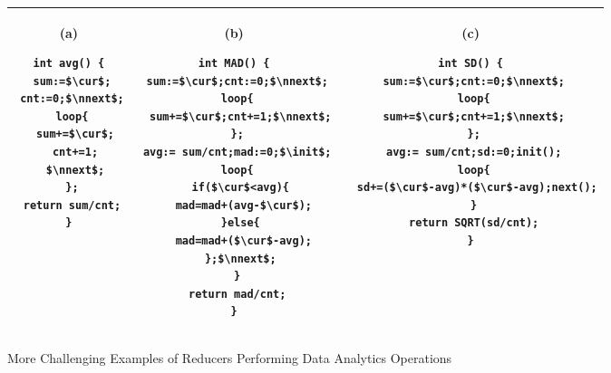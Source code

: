 \begin{figure}
	\centering
	\lstset{language=C,
		basicstyle=\ttfamily\scriptsize}
	\begin{tabular}{|c|c|c|}
		\hline
		\begin{minipage}[t]{0.25\textwidth}
			(a)
			\begin{lstlisting}[mathescape=true]
int avg() {
 sum:=$\cur$;
 cnt:=0;$\nnext$;
 loop{
  sum+=$\cur$;
  cnt+=1;
  $\nnext$;
 };
 return sum/cnt;
}
			\end{lstlisting}
		\end{minipage}&
		\begin{minipage}[t]{0.35\textwidth}
			(b)
\begin{lstlisting}[mathescape=true]
int MAD() {
 sum:=$\cur$;cnt:=0;$\nnext$;
 loop{
  sum+=$\cur$;cnt+=1;$\nnext$;
 };
 avg:= sum/cnt;mad:=0;$\init$;
 loop{
  if($\cur$<avg){
   mad=mad+(avg-$\cur$);
  }else{
   mad=mad+($\cur$-avg);
  };$\nnext$;
 }
 return mad/cnt;
}
\end{lstlisting}
		\end{minipage}&
		\begin{minipage}[t]{0.4\textwidth}
			(c)
			\begin{lstlisting}[mathescape=true]
int SD() {
 sum:=$\cur$;cnt:=0;$\nnext$;
 loop{
 sum+=$\cur$;cnt+=1;$\nnext$;
 };
 avg:= sum/cnt;sd:=0;init();
 loop{
  sd+=($\cur$-avg)*($\cur$-avg);next();
 }
 return SQRT(sd/cnt);
}
			\end{lstlisting}
		\end{minipage}\\
		\hline		
	\end{tabular}
	\caption{More Challenging Examples of Reducers Performing Data Analytics Operations}
	\label{fig:examples2}
\end{figure}